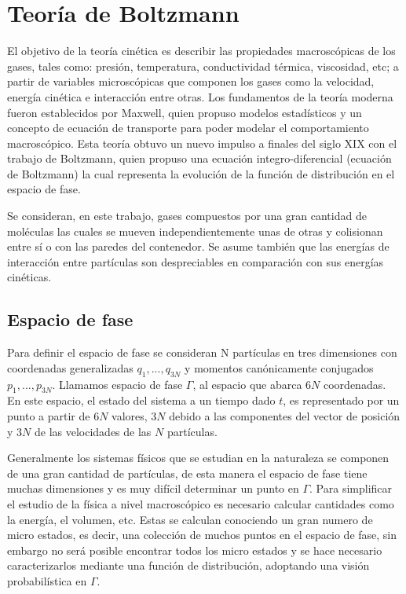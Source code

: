 \chapter{Teoría de Boltzmann}


\noindent El objetivo de la teoría cinética es describir las propiedades macroscópicas de los gases, tales como: presión, temperatura, conductividad térmica, viscosidad, etc; a partir de variables microscópicas que componen los gases como la velocidad, energía cinética e interacción entre otras. Los fundamentos de la teoría moderna fueron establecidos por Maxwell, quien propuso modelos estadísticos y un concepto de ecuación de transporte para poder modelar el comportamiento macroscópico. Esta teoría obtuvo un nuevo impulso a finales del siglo XIX con el trabajo de Boltzmann, quien propuso una ecuación integro-diferencial (ecuación de Boltzmann) la cual representa la evolución de la función de distribución en el espacio de fase. 

\medskip

\noindent Se consideran, en este trabajo, gases compuestos por una gran cantidad de moléculas las cuales se mueven independientemente unas de otras y colisionan entre sí o con las paredes del contenedor. Se asume también que las energías de interacción entre partículas son despreciables en comparación con sus energías cinéticas.

\section{Espacio de fase}

\noindent Para definir el espacio de fase se consideran N partículas en tres dimensiones con coordenadas generalizadas $q_{1}, ..., q_{3N}$ y momentos canónicamente conjugados  $p_{1}, ... , p_{3N}$. Llamamos espacio de fase $\Gamma$, al espacio que abarca $6N$ coordenadas. En este espacio, el estado del sistema a un tiempo dado $t$, es representado por un punto a partir de $6N$ valores, $3N$ debido a las componentes del vector de posición y $3N$ de las velocidades de las $N$ partículas.

\medskip

\noindent Generalmente los sistemas físicos que se estudian en la naturaleza se componen de una gran cantidad de partículas, de esta manera el espacio de fase tiene muchas dimensiones y es muy difícil determinar un punto en $\Gamma$. Para simplificar el estudio de la física a nivel macroscópico es necesario calcular cantidades como la energía, el volumen, etc. Estas se calculan conociendo un gran numero de micro estados, es decir, una colección de muchos puntos en el espacio de fase, sin embargo no será posible encontrar todos los micro estados y se hace necesario caracterizarlos mediante una función de distribución, adoptando una visión probabilística en $\Gamma$. 

